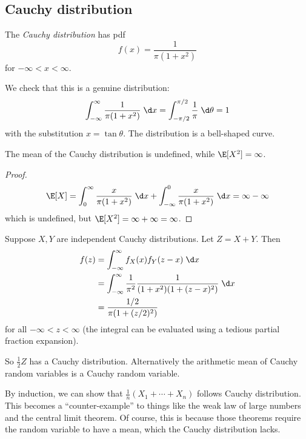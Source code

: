 \documentclass[a4paper]{article}
\begin{document}
\subsection{Cauchy distribution}

\begin{defi}
  The \emph{Cauchy distribution} has pdf
  \[
    f(x) = \frac{1}{\pi(1 + x^2)}
  \]
  for $-\infty < x < \infty$.
\end{defi}
We check that this is a genuine distribution:
\[
  \int_{-\infty}^\infty \frac{1}{\pi(1 + x^2)}\;\d x = \int_{-\pi/2}^{\pi/2}\frac{1}{\pi}\;\d \theta = 1
\]
with the substitution $x = \tan \theta$. The distribution is a bell-shaped curve.

\begin{prop}
  The mean of the Cauchy distribution is undefined, while $\E[X^2] = \infty$.
\end{prop}

\begin{proof}
  \[
    \E[X] = \int_0^\infty \frac{x}{\pi(1 + x^2)}\;\d x + \int_{-\infty}^0 \frac{x}{\pi(1 + x^2)}\;\d x = \infty - \infty
  \]
  which is undefined, but $\E[X^2] = \infty + \infty = \infty$.
\end{proof}

Suppose $X, Y$ are independent Cauchy distributions. Let $Z = X + Y$. Then
\begin{align*}
  f(z) &= \int_{-\infty}^\infty f_X(x)f_Y(z - x)\;\d x\\
  &= \int_{-\infty}^\infty \frac{1}{\pi^2} \frac{1}{(1 + x^2)(1 + (z - x)^2)}\;\d x\\
  &= \frac{1/2}{\pi(1 + (z/2)^2)}
\end{align*}
for all $-\infty < z < \infty$ (the integral can be evaluated using a tedious partial fraction expansion).

So $\frac{1}{2}Z$ has a Cauchy distribution. Alternatively the arithmetic mean of Cauchy random variables is a Cauchy random variable.

By induction, we can show that $\frac{1}{n}(X_1 + \cdots + X_n)$ follows Cauchy distribution. This becomes a ``counter-example'' to things like the weak law of large numbers and the central limit theorem. Of course, this is because those theorems require the random variable to have a mean, which the Cauchy distribution lacks.
\end{document}
